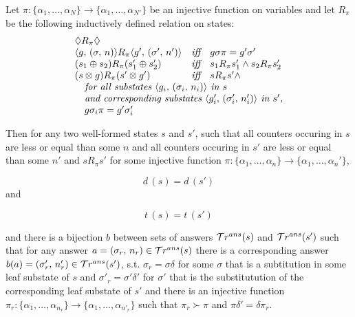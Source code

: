 \begin{lemma}
\label{lem:gen_measures_changing_env}
Let $\pi \colon \{ \alpha_1, \dots, \alpha_N \} \to \{ \alpha_1, \dots, \alpha_{N'} \}$ be an injective function on variables and let $R_{\pi}$ be the following inductively defined relation on states:
\[ \begin{array}{lcl}
\Diamond R_{\pi} \Diamond & & \\
\taskst{g}{\mkenv{\sigma}{n}} R_{\pi} \taskst{g'}{\mkenv{\sigma'}{n'}} & \textit{iff} & g \sigma \pi = g' \sigma' \\
(s_1 \oplus s_2) R_{\pi} (s'_1 \oplus s'_2) & \textit{iff} & s_1 R_{\pi} s'_1 \land s_2 R_{\pi} s'_2  \\
(s \otimes g) R_{\pi} (s' \otimes g') & \textit{iff} & s R_{\pi} s' \land \\
\multicolumn{3}{l}{\textit{\quad for all substates $\taskst{g_i}{\mkenv{\sigma_i}{n_i}}$ in $s$}}\\
\multicolumn{3}{l}{\textit{\quad and corresponding substates $\taskst{g'_i}{\mkenv{\sigma'_i}{n'_i}}$ in $s'$,}} \\
\multicolumn{3}{l}{\quad g \sigma_i \pi = g' \sigma'_i} \\
\end{array} \]

Then for any two well-formed states $s$ and $s'$, such that all counters occuring in $s$ are less or equal than some $n$ and all counters occuring in $s'$ are less or equal than some $n'$ and $s R_{\pi} s'$ for some injective function $\pi \colon \{ \alpha_1, \dots, \alpha_n \} \to \{ \alpha_1, \dots, \alpha_n' \}$,

\[ d\,(s) = d\,(s') \]
and

\[t\,(s) = t\,(s') \]

and there is a bijection $b$ between sets of answers $\mathcal{T}r^{ans}(s)$ and $\mathcal{T}r^{ans}(s')$ such that for any answer $a = (\sigma_r ,\, n_r) \in \mathcal{T}r^{ans}(s)$ there is a corresponding answer $b(a) = (\sigma'_r ,\, n'_r) \in \mathcal{T}r^{ans}(s')$, s.t. $\sigma_r = \sigma \delta$ for some $\sigma$ that is a subtitution in some leaf substate of $s$ and $\sigma'_r = \sigma' \delta'$ for $\sigma'$ that is the substitutution of the corresponding leaf substate of $s'$ and there is an injective function $\pi_r \colon \{ \alpha_1, \dots, \alpha_{n_r} \} \to \{ \alpha_1, \dots, \alpha_{n'_r} \}$ such that $\pi_r \succ \pi$ and $\pi \delta' = \delta \pi_r$.
\end{lemma}
